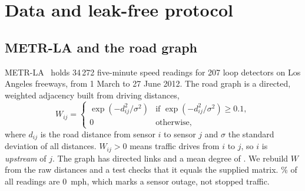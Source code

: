 \documentclass[11pt,a4paper]{article}
\newcommand{\mph}{~mph}
\begin{document}
\section{Data and leak-free protocol}\label{sec:data}

\subsection{METR-LA and the road graph}
METR-LA~\citep{jagadish2014bigdata,li2018dcrnn} holds 34\,272 five-minute speed readings for 207 loop detectors on Los
Angeles freeways, from 1 March to 27 June 2012. The road graph is a directed, weighted adjacency built from driving
distances,
\begin{equation}
W_{ij} = \begin{cases}\exp\!\left(-d_{ij}^2/\sigma^2\right) & \text{if } \exp\!\left(-d_{ij}^2/\sigma^2\right)\ge 0.1,\\ 0 & \text{otherwise,}\end{cases}
\end{equation}
where $d_{ij}$ is the road distance from sensor $i$ to sensor $j$ and $\sigma$ the standard deviation of all distances.
$W_{ij}>0$ means traffic drives from $i$ to $j$, so $i$ is \emph{upstream} of $j$. The graph has \GraphEdges{} directed
links and a mean degree of \GraphDegree. We rebuild $W$ from the raw distances and a test checks that it equals the
supplied matrix. \ZeroPct\% of all readings are 0\mph, which marks a sensor outage, not stopped traffic.
\end{document}
